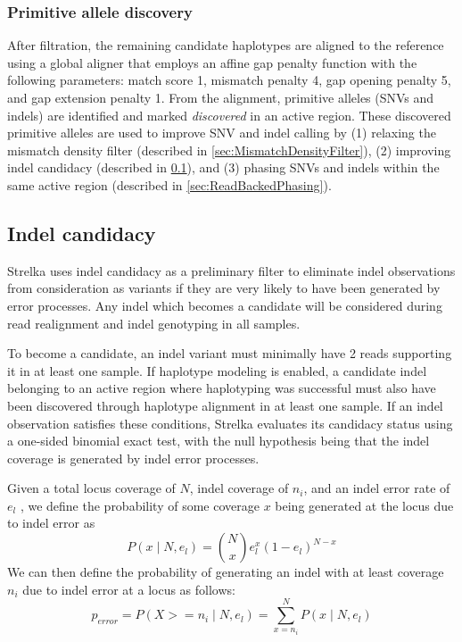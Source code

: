 \documentclass{article}
\begin{document}
\subsubsection{Primitive allele discovery}
After filtration, the remaining candidate haplotypes are aligned to the reference using a global aligner that employs an affine gap penalty function with the following parameters: match score 1, mismatch penalty 4, gap opening penalty 5, and gap extension penalty 1. From the alignment, primitive alleles (SNVs and indels) are identified and marked {\em discovered} in an active region. These discovered primitive alleles are used to improve SNV and indel calling by (1) relaxing the mismatch density filter (described in \ref{sec:MismatchDensityFilter}), (2) improving indel candidacy (described in \ref{sec:IndelCandidacy}), and (3) phasing SNVs and indels within the same active region (described in \ref{sec:ReadBackedPhasing}).

\subsection{Indel candidacy}
\label{sec:IndelCandidacy}

Strelka uses indel candidacy as a preliminary filter to eliminate indel observations from consideration as variants if they are very likely to have been generated by error processes. Any indel which becomes a candidate will be considered during read realignment and indel genotyping in all samples.

To become a candidate, an indel variant must minimally have 2 reads supporting it in at least one sample. If haplotype modeling is enabled, a candidate indel belonging to an active region where haplotyping was successful must also have been discovered through haplotype alignment in at least one sample. If an indel observation satisfies these conditions, Strelka evaluates its candidacy status using a one-sided binomial exact test, with the null hypothesis being that the indel coverage is generated by indel error processes.

Given a total locus coverage of $N$, indel coverage of $n_i$, and an indel error rate of $e_l$ , we define the probability of some coverage $x$ being generated at the locus due to indel error as
\begin{equation*}
P(x \mid N, e_l) = \binom {N} {x} e^{x}_l (1 - e_l)^{N - x}
\end{equation*}
We can then define the probability of generating an indel with at least coverage $n_i$ due to indel error at a locus as follows:
\begin{equation*}
p_{error} = P(X >= n_i \mid N, e_l) = \sum_{x = n_i}^{N} P(x \mid N, e_l)
\end{equation*}
\end{document}
